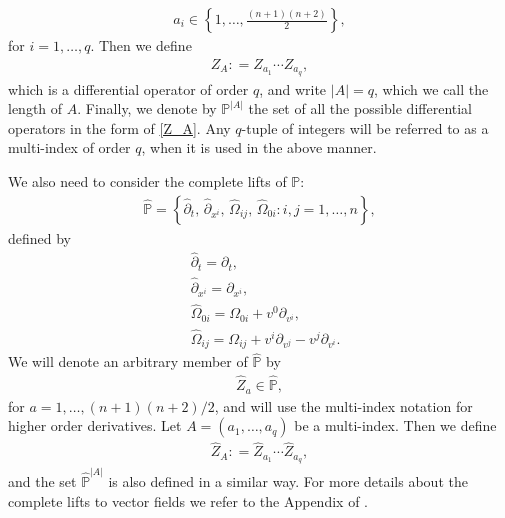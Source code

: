 \documentclass{article}
\newcommand{\bbp}{{\mathbb P}}
\begin{document}
\begin{align*}
a_i \in \left\{ 1 , \dots , \frac{ ( n + 1 ) ( n + 2 ) }{ 2 } \right\} ,
\end{align*}
for $ i = 1 , \dots , q $. Then we define
\begin{align}
Z_A : = Z_{ a_1 } \cdots Z_{ a_q } , \label{Z_A}
\end{align}
which is a differential operator of order $ q $, and write $| A | = q $, which we call the length of $ A $. Finally, we denote by $ \bbp^{ | A | } $ the set of all the possible differential operators in the form of \eqref{Z_A}. Any $ q $-tuple of integers will be referred to as a multi-index of order $ q $, when it is used in the above manner.

We also need to consider the complete lifts of $ \bbp $:
\begin{align*}
\hat{ \bbp } = \left\{ \hat{ \partial }_t , \, \hat{ \partial }_{ x^i } , \, \hat{ \Omega }_{ i j } , \, \hat{ \Omega }_{ 0 i } : i , j = 1 , \dots , n \right\} ,
\end{align*}
defined by
\begin{align*}
& \hat{ \partial }_t = \partial_t , \\
& \hat{ \partial }_{ x^i } = \partial_{ x^i } , \\
& \hat{ \Omega }_{ 0 i } = \Omega_{ 0 i } + v^0 \partial_{ v^i } , \\
& \hat{ \Omega }_{ i j } = \Omega_{ i j } + v^i \partial_{ v^j } - v^j \partial_{ v^i } .
\end{align*}
We will denote an arbitrary member of $ \hat{ \bbp } $ by
\begin{align*}
\hat{ Z }_a \in \hat{ \bbp } ,
\end{align*}
for $ a = 1 , \dots , ( n + 1 ) ( n + 2 ) / 2 $, and will use the multi-index notation for higher order derivatives. Let $ A = ( a_1 , \dots , a_q ) $ be a multi-index. Then we define
\begin{align*}
\hat{ Z }_A : = \hat{ Z }_{ a_1 } \cdots \hat{ Z }_{ a_q } ,
\end{align*}
and the set $ \hat{ \bbp }^{ | A | } $ is also defined in a similar way. For more details about the complete lifts to vector fields we refer to the Appendix of \cite{FJS17}.







%
\end{document}
